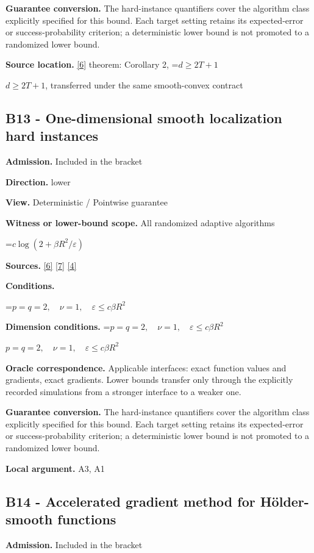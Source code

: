 \documentclass[10pt,a4paper]{article}
\newcommand{\AtlasMath}[1]{\par\begingroup\centering\setbox0=\hbox{$\displaystyle #1$}\ifdim\wd0>1.4\linewidth\typeout{ATLAS WIDE FORMULA: \the\wd0}\fi\ifdim\wd0>\linewidth\resizebox{\linewidth}{!}{\box0}\else\box0\fi\par\endgroup}
\newcommand{\AtlasInlineMath}[1]{\begingroup\setbox0=\hbox{$#1$}\ifdim\wd0>.4\linewidth\endgroup\AtlasMath{#1}\else\endgroup$#1$\fi}
\begin{document}
\textbf{Guarantee conversion.} The hard-instance quantifiers cover the algorithm class explicitly specified for this bound. Each target setting retains its expected-error or success-probability criterion; a deterministic lower bound is not promoted to a randomized lower bound.

\textbf{Source location.} \href{https://arxiv.org/pdf/2101.09740v2}{[6]} theorem: Corollary 2, \AtlasInlineMath{d\ge2T+1}, transferred under the same smooth-convex contract

\subsection{B13 - One-dimensional smooth localization hard instances}
\textbf{Admission.} Included in the bracket

\textbf{Direction.} lower

\textbf{View.} Deterministic / Pointwise guarantee

\textbf{Witness or lower-bound scope.} All randomized adaptive algorithms

\AtlasMath{c\log(2+\beta R^2/\varepsilon)}
\textbf{Sources.} \href{https://arxiv.org/pdf/2101.09740v2}{[6]} \href{https://arxiv.org/pdf/2609.33360v2}{[7]} \href{https://arxiv.org/pdf/2609.10874}{[4]}

\textbf{Conditions.} 
\AtlasMath{p=q=2,\quad\nu=1,\quad\varepsilon\le c\beta R^2}


\textbf{Dimension conditions.} \AtlasInlineMath{p=q=2,\quad\nu=1,\quad\varepsilon\le c\beta R^2}

\textbf{Oracle correspondence.} Applicable interfaces: exact function values and gradients, exact gradients. Lower bounds transfer only through the explicitly recorded simulations from a stronger interface to a weaker one.

\textbf{Guarantee conversion.} The hard-instance quantifiers cover the algorithm class explicitly specified for this bound. Each target setting retains its expected-error or success-probability criterion; a deterministic lower bound is not promoted to a randomized lower bound.

\textbf{Local argument.} A3, A1

\subsection{B14 - Accelerated gradient method for Hölder-smooth functions}
\textbf{Admission.} Included in the bracket
\end{document}
